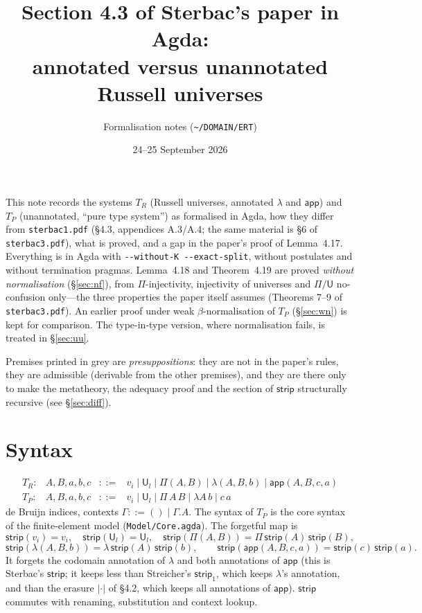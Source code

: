 \documentclass[10pt]{article}
\title{Section 4.3 of Sterbac's paper in Agda:\\
annotated versus unannotated Russell universes}
\author{Formalisation notes (\texttt{\textasciitilde/DOMAIN/ERT})}
\date{24--25 September 2026}
\newcommand{\pre}[1]{{\color{gray}#1}}  %
\newcommand{\U}{\mathsf{U}}
\newcommand{\lam}{\lambda}
\newcommand{\app}{\mathsf{app}}
\newcommand{\strip}{\mathsf{strip}}
\newcommand{\TR}{T_R}
\newcommand{\TP}{T_P}
\newcommand{\agda}[1]{\texttt{#1}}
\theoremstyle{remark}
\begin{document}
\sloppy
\maketitle

\noindent
This note records the systems $\TR$ (Russell universes, annotated $\lam$ and
$\app$) and $\TP$ (unannotated, ``pure type system'') as formalised in Agda,
how they differ from \texttt{sterbac1.pdf} (§4.3, appendices A.3/A.4; the same
material is §6 of \texttt{sterbac3.pdf}), what is proved, and a gap in the
paper's proof of Lemma~4.17.  Everything is in Agda with
\verb|--without-K --exact-split|, without postulates and without
termination pragmas.  Lemma~4.18 and Theorem~4.19 are proved
\emph{without normalisation} (\S\ref{sec:nf}), from $\Pi$-injectivity,
injectivity of universes and $\Pi/\U$ no-confusion only---the three
properties the paper itself assumes (Theorems 7--9 of \texttt{sterbac3.pdf}).
An earlier proof under weak $\beta$-normalisation of $\TP$ (\S\ref{sec:wn}) is
kept for comparison.  The type-in-type version, where normalisation fails,
is treated in \S\ref{sec:uu}.

Premises printed in \pre{grey} are \emph{presuppositions}: they are not in the
paper's rules, they are admissible (derivable from the other premises), and
they are there only to make the metatheory, the adequacy proof and the
section of $\strip$ structurally recursive (see \S\ref{sec:diff}).

\section{Syntax}

\[
\begin{array}{lrcl}
\TR: & A,B,a,b,c & ::= & v_i \mid \U_l \mid \Pi(A,B) \mid \lam(A,B,b) \mid \app(A,B,c,a)\\[2pt]
\TP: & A,B,a,b,c & ::= & v_i \mid \U_l \mid \Pi\,A\,B \mid \lam A\, b \mid c\,a
\end{array}
\]
de Bruijn indices, contexts $\Gamma ::= () \mid \Gamma.A$.  The syntax of
$\TP$ is the core syntax of the finite-element model
(\agda{Model/Core.agda}).  The forgetful map is
\[
\strip(v_i)=v_i,\quad \strip(\U_l)=\U_l,\quad
\strip(\Pi(A,B))=\Pi\,\strip(A)\,\strip(B),
\]
\[
\strip(\lam(A,B,b))=\lam\,\strip(A)\,\strip(b),\qquad
\strip(\app(A,B,c,a))=\strip(c)\,\strip(a).
\]
It forgets the codomain annotation of $\lam$ and both annotations of $\app$
(this is Sterbac's $\strip$; it keeps less than Streicher's $\mathsf{strip}_1$,
which keeps $\lam$'s annotation, and than the erasure $|\cdot|$ of §4.2, which
keeps all annotations of $\app$).  $\strip$ commutes with renaming,
substitution and context lookup.
\end{document}
